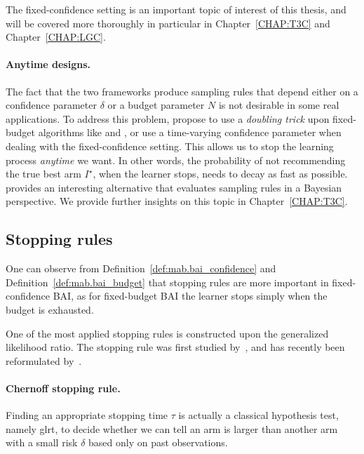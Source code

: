 The fixed-confidence setting is an important topic of interest of this thesis, and will be covered more thoroughly in particular in Chapter~\ref{CHAP:T3C} and Chapter~\ref{CHAP:LGC}.

\paragraph{Anytime designs.}

The fact that the two frameworks produce sampling rules that depend either on a confidence parameter $\delta$ or a budget parameter $N$ is not desirable in some real applications. To address this problem, \cite{jun2016atlucb} propose to use a \emph{doubling trick} upon fixed-budget algorithms like \SR and \SHA, or use a time-varying confidence parameter when dealing with the fixed-confidence setting. This allows us to stop the learning process \emph{anytime} we want. In other words, the probability of not recommending the true best arm $I^\star$, when the learner stops, needs to decay as fast as possible. \cite{russo2016ttts} provides an interesting alternative that evaluates sampling rules in a Bayesian perspective. We provide further insights on this topic in Chapter~\ref{CHAP:T3C}. %

\subsection{Stopping rules}\label{sec:mab.bai.stopping}

One can observe from Definition~\ref{def:mab.bai_confidence} and Definition~\ref{def:mab.bai_budget} that stopping rules are more important in fixed-confidence BAI, as for fixed-budget BAI the learner stops simply when the budget is exhausted.

One of the most applied stopping rules is constructed upon the \gls{generalized likelihood ratio}. The stopping rule was first studied by~\cite{chernoff1959}, and has recently been reformulated by~\cite{garivier2016tracknstop}.

\paragraph{Chernoff stopping rule.}
Finding an appropriate stopping time $\tau$ is actually a classical hypothesis test, namely \gls{glrt}, to decide whether we can tell an arm is larger than another arm with a small risk $\delta$ based only on past observations.


